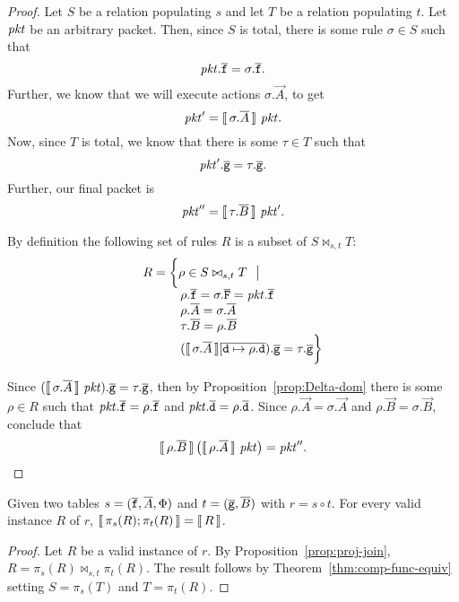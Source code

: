 \begin{proof}
  Let $S$ be a relation populating $s$ and let $T$ be a relation
  populating $t$.
  Let $\mathit{pkt}$ be an arbitrary packet. Then, since $S$ is total, there
  is some rule $\sigma \in S$ such that
  \[\mathit{pkt}.\overline{\texttt{f}} = \sigma.\overline{\texttt{f}}.\] Further, we know that
  we will execute actions $\sigma.\vec A$, to get
  \[\mathit{pkt}' = \llbracket\,\sigma.\overline{A}\,\rrbracket~\mathit{pkt}.\] Now, since $T$ is total, we know
  that there is some $\tau \in T$ such that
  \[\mathit{pkt}'.\overline{\texttt{g}} = \tau.\overline{\texttt{g}}.\] Further, our final
  packet is \[\mathit{pkt}'' = \llbracket\,\tau.\overline{B}\,\rrbracket~\mathit{pkt}'.\]

  By definition the following set of rules $R$ is a subset of $S \bowtie_{s,t}T$:
  \[\begin{array}{l}
      R  = \bigg\{\rho \in S \bowtie_{s,t} T~~\big|\\
      \qquad\quad \rho.\overline{\texttt{f}} = \sigma.\overline{\texttt{F}} = \mathit{pkt}.\overline{\texttt{f}}\\
      \qquad\quad \rho.\overline{A} = \sigma.\overline{A} \\
      \qquad\quad \tau.\overline{B} = \rho.\overline{B} \\
      \qquad\quad (\llbracket\,\sigma.\overline{A}\,\rrbracket[\overline{\texttt{d} \mapsto \rho.\texttt{d}}).\overline{\texttt{g}} =\tau.\overline{ \texttt{g}} \bigg\}
    \end{array}\]

  Since $(\llbracket\,\sigma.\overline{A}\,\rrbracket~\mathit{pkt}).\overline{\texttt{g}} = \tau.\overline{\texttt{g}}$, then by 
  Proposition~\ref{prop:Delta-dom} there is some $\rho \in R$ such
  that $\mathit{pkt}.\overline{\texttt{f}} = \rho.\overline{\texttt{f}}$ and $\mathit{pkt}.\overline{\texttt{d}} =
  \rho.\overline{\texttt{d}}$. Since $\rho.\vec A = \sigma.\vec A$ and
  $\rho.\vec B = \sigma.\vec B$, conclude that
  \[\llbracket\,\rho.\overline{B}\,\rrbracket\left(\llbracket\,\rho.\overline{A}\,\rrbracket~\mathit{pkt}\right) = \mathit{pkt}''.\]
\end{proof}


\begin{theorem}
  \label{thm:decomp-func-equiv}
  Given two tables $s = (\overline{\texttt{f}},\overline{A},\Phi)$ and
  $t = (\overline{\texttt{g}},\overline{B})$ with $r = s \circ t$. For every valid
  instance $R$ of $r$,
  $\llbracket\,\pi_s(R);\pi_t(R)\,\rrbracket = \llbracket\,R\,\rrbracket$.
\end{theorem}

\begin{proof}
  Let $R$ be a valid instance of $r$. By
  Proposition~\ref{prop:proj-join},
  $R = \pi_s(R)\bowtie_{s,t}\pi_t(R)$. The result follows by
  Theorem~\ref{thm:comp-func-equiv} setting $S = \pi_s(T)$ and
  $T=\pi_t(R)$.
\end{proof}

